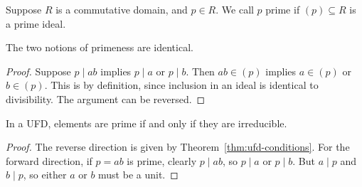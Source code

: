 \begin{definition}
    Suppose \(R\) is a commutative domain, and \(p \in R\).
    We call \(p\) prime if \((p) \subseteq R\) is a prime ideal.
\end{definition}
\begin{proposition}
    The two notions of primeness are identical.
\end{proposition}
\begin{proof}
    Suppose \(p \mid ab\) implies \(p \mid a\) or \(p \mid b\).
    Then \(ab \in (p)\) implies \(a \in (p)\) or \(b \in (p)\).
    This is by definition,
    since inclusion in an ideal is identical to divisibility.
    The argument can be reversed.
\end{proof}
\begin{lemma}
    In a UFD, elements are prime if and only if they are irreducible.
\end{lemma}
\begin{proof}
    The reverse direction is given by Theorem~\ref{thm:ufd-conditions}.
    For the forward direction,
    if \(p = ab\) is prime, clearly \(p \mid ab\),
    so \(p \mid a\) or \(p \mid b\).
    But \(a \mid p\) and \(b \mid p\),
    so either \(a\) or \(b\) must be a unit.
\end{proof}

